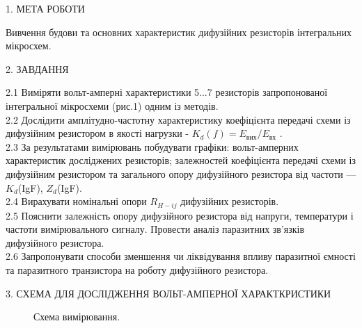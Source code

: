 \documentclass[a4paper,14pt]{extreport}
\begin{document}
\begin{center}1. МЕТА РОБОТИ\\ \end{center}

Вивчення будови та основних характеристик дифузійних резисторів інтегральних
мікросхем.

\begin{center}2. ЗАВДАННЯ\\ \end{center}\par

2.1 Виміряти вольт-амперні характеристики 5...7 резисторів запропонованої інтегральної
мікросхеми (рис.1) одним із методів.\\

2.2 Дослідити амплітудно-частотну характеристику коефіцієнта передачі схеми із
дифузійним резистором в якості нагрузки - $K_{d}(f)= E_{\text{вих}}/E_{\text{вх}}$ .\\

2.3 За результатами вимірювань побудувати графіки: вольт-амперних характеристик
досліджених резисторів; залежностей коефіцієнта передачі схеми із дифузійним
резистором та загального опору дифузійного резистора від частоти — $K_{d}$(IgF), $Z_{d}$(IgF).\\

2.4 Вирахувати номінальні опори $R_{H-ij}$ дифузійних резисторів.\\


2.5 Пояснити залежність опору дифузійного резистора від напруги, температури і частоти
вимірювального сигналу. Провести аналіз паразитних зв'язків дифузійного резистора.\\

2.6 Запропонувати способи зменшення чи ліквідування впливу паразитної ємності та
паразитного транзистора на роботу дифузійного резистора.

\newpage
\begin{center}3. СХЕМА ДЛЯ ДОСЛІДЖЕННЯ ВОЛЬТ-АМПЕРНОЇ ХАРАКТКРИСТИКИ\\ \end{center}

\begin{figure}[ht]
\caption{Схема вимірювання.}
\label{ris111}
\end{figure}
\newpage
\end{document}
